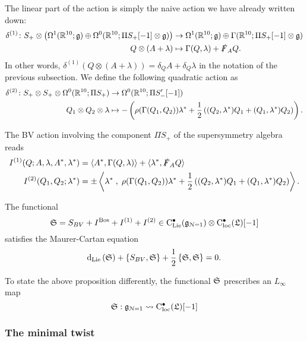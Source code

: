 \documentclass[10pt, oneside]{article}
\def\<{\langle}
\def\>{\rangle}
\def\cloc{{\rm C}_{\rm loc}}
\def\bu{\bullet}
\def\clie{{\rm C}_{\rm Lie}}
\begin{document}
\begin{rmk}
The linear part of the action is simply the naive action we have already written down:
\begin{align*}
\delta^{(1)} \colon S_+ \otimes \left( \Omega^1(\mathbb R^{10} ; \mathfrak{g}) \oplus \Omega^0(\mathbb R^{10}; \Pi S_+[-1] \otimes \mathfrak{g}) \right) &\to \Omega^1(\mathbb R^{10} ; \mathfrak{g}) \oplus \Gamma(\mathbb R^{10}; \Pi S_+[-1] \otimes \mathfrak{g}) \\
Q \otimes (A + \lambda) &\mapsto  \Gamma(Q,\lambda) + \slashed{F}_A Q .
\end{align*}
In other words, $\delta^{(1)}(Q \otimes (A + \lambda)) = \delta_Q A + \delta_Q\lambda $ in the notation of the previous subsection.
We define the following quadratic action as
\begin{align*}
\delta^{(2)} \colon S_+ \otimes S_+ \otimes \Omega^0(\mathbb R^{10}; \Pi S_+) &\to \Omega^0(\mathbb R^{10}; \Pi S_-' [-1]) \\
Q_1 \otimes Q_2 \otimes \lambda &\mapsto - \left(\rho(\Gamma(Q_1,Q_2)) \lambda^* + \frac 12 \left((Q_2, \lambda^*)Q_1 + (Q_1, \lambda^*)Q_2\right)\right) .
\end{align*}

The BV action involving the component $\Pi S_+$ of the supersymmetry algebra reads
\begin{align*}
I ^{(1)} (Q ; A, \lambda, A^*, \lambda^*) & = \<A^* , \Gamma(Q, \lambda)\> + \<\lambda^*, \sd F_A Q\> \\
I^{(2)} (Q_1,Q_2 ; \lambda^*) & = \pm \left\<\lambda^* \;,\; \rho(\Gamma(Q_1,Q_2)) \lambda^* + \frac 12 \left((Q_2, \lambda^*)Q_1 + (Q_1, \lambda^*)Q_2\right)\right\> .
\end{align*}

\begin{prop}
The functional
\[
\fS = S_{BV} + I^{\rm Bos} + I^{(1)} + I^{(2)} \in \clie^\bu(\fg_{\cN=1}) \otimes \cloc^\bu(\fL) [-1]
\]
satisfies the Maurer-Cartan equation
\[
{\rm d}_{\rm Lie}  \left( \mathfrak S \right) + \{S_{BV}, \mathfrak S\} + \frac{1}{2} \left\{\mathfrak S , \mathfrak S \right\} = 0 .
\]
\end{prop}

To state the above proposition differently, the functional $\mathfrak S$ prescribes an $L_\infty$ map
\[
\fS : \fg_{\cN=1} \rightsquigarrow \cloc^\bu(\fL) [-1]
\]

\subsubsection{The minimal twist}



\end{rmk}
\end{document}
